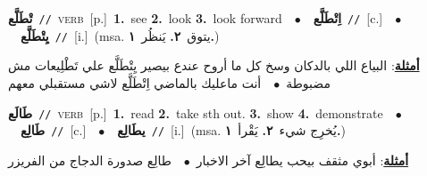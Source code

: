 \documentclass[10pt,a4paper,twoside]{article} %
\begin{document}
\begin{multicols}{2}
{\setlength\topsep{0pt}\textbf{\foreignlanguage{arabic}{تْطَلَّع}}\ {\color{gray}\texttt{//}\color{black}}\ \textsc{verb}\ [p.]\ \textbf{1.}~see  \textbf{2.}~look  \textbf{3.}~look forward\ \ $\bullet$\ \ \setlength\topsep{0pt}\textbf{\foreignlanguage{arabic}{اِتْطَلَّع}}\ {\color{gray}\texttt{//}\color{black}}\ [c.]\ \ $\bullet$\ \ \setlength\topsep{0pt}\textbf{\foreignlanguage{arabic}{يِتْطَلَّع}}\ {\color{gray}\texttt{//}\color{black}}\ [i.]\ \color{gray}(msa. \foreignlanguage{arabic}{يتوق}~\foreignlanguage{arabic}{\textbf{٢.}}  \foreignlanguage{arabic}{يَنظُر}~\foreignlanguage{arabic}{\textbf{١.}})\color{black}\  \begin{flushright}\color{gray}\foreignlanguage{arabic}{\textbf{\underline{\foreignlanguage{arabic}{أمثلة}}}: البياع اللي بالدكان وسخ كل ما أروح عندع بيصير يِتْطَلَّع علي تَطْلِيعات مش مضبوطة\ $\bullet$\ \  أنت ماعليك بالماضي اِتْطَلَّع لاشي مستقبلي معهم}\end{flushright}\color{black}} \vspace{2mm}

{\setlength\topsep{0pt}\textbf{\foreignlanguage{arabic}{طَالَع}}\ {\color{gray}\texttt{//}\color{black}}\ \textsc{verb}\ [p.]\ \textbf{1.}~read  \textbf{2.}~take sth out.  \textbf{3.}~show  \textbf{4.}~demonstrate\ \ $\bullet$\ \ \setlength\topsep{0pt}\textbf{\foreignlanguage{arabic}{طَالِع}}\ {\color{gray}\texttt{//}\color{black}}\ [c.]\ \ $\bullet$\ \ \setlength\topsep{0pt}\textbf{\foreignlanguage{arabic}{يطَالِع}}\ {\color{gray}\texttt{//}\color{black}}\ [i.]\ \color{gray}(msa. \foreignlanguage{arabic}{يُخرِج شيء}~\foreignlanguage{arabic}{\textbf{٢.}}  \foreignlanguage{arabic}{يَقْرأ}~\foreignlanguage{arabic}{\textbf{١.}})\color{black}\  \begin{flushright}\color{gray}\foreignlanguage{arabic}{\textbf{\underline{\foreignlanguage{arabic}{أمثلة}}}: أبوي مثقف بيحب يطالِع آخر الاخبار\ $\bullet$\ \  طالِع صدورة الدجاج من الفريزر}\end{flushright}\color{black}} \vspace{2mm}


\end{multicols}
\end{document}
